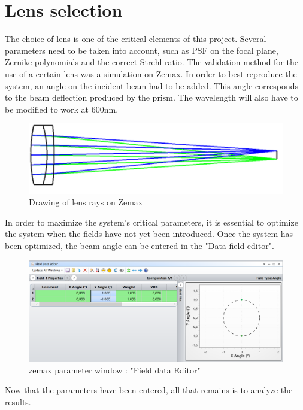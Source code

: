 \section{Lens selection}\label{sec:Opti_Lens}
The choice of lens is one of the critical elements of this project. Several parameters need to be taken
into account, such as \gls{PSF} on the focal plane, Zernike polynomials and the correct Strehl ratio.
The validation method for the use of a certain lens was a simulation on Zemax.
In order to best reproduce the system, an angle on the incident beam had to be added.
This angle corresponds to the beam deflection produced by the prism. The wavelength will also have to be modified to work at 600nm.
\begin{figure}[H]
    \centering
    \includegraphics[scale=0.8]{assets/figures/Optical Design/Zemax_RayTrace.png}
    \caption{Drawing of lens rays on Zemax}
    \label{fig:Opti_LensRayTrace}
\end{figure}
In order to maximize the system's critical parameters, it is essential to optimize the system when
the fields have not yet been introduced.
Once the system has been optimized, the beam angle can be entered in the "Data field editor".
\begin{figure}[H]
    \centering
    \includegraphics[scale=0.5]{assets/figures/Optical Design/Zemax_FieldEditor.png}
    \caption{zemax parameter window : "Field data Editor"}
    \label{fig:Opti_FieldZemax}
\end{figure}
Now that the parameters have been entered, all that remains is to analyze the results.
\newpage
